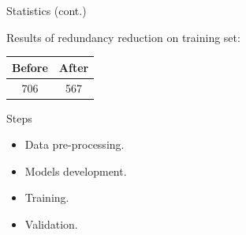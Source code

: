 \documentclass[pdf]
{beamer}
\begin{document}
\begin{frame}{Statistics (cont.)}

	Results of redundancy reduction on training set:\\
	\begin{center}
		\begin{tabular}{| c | c |}
			\hline
			Before & After\\
			\hline
			706 & 567\\
			\hline
		\end{tabular}		
	\end{center}
	
\end{frame}

\begin{frame}{Steps}

	\begin{itemize}
		\item Data pre-processing.
		\item Models development.
		\item Training.
		\item Validation.
	\end{itemize}
\end{frame}
\end{document}
